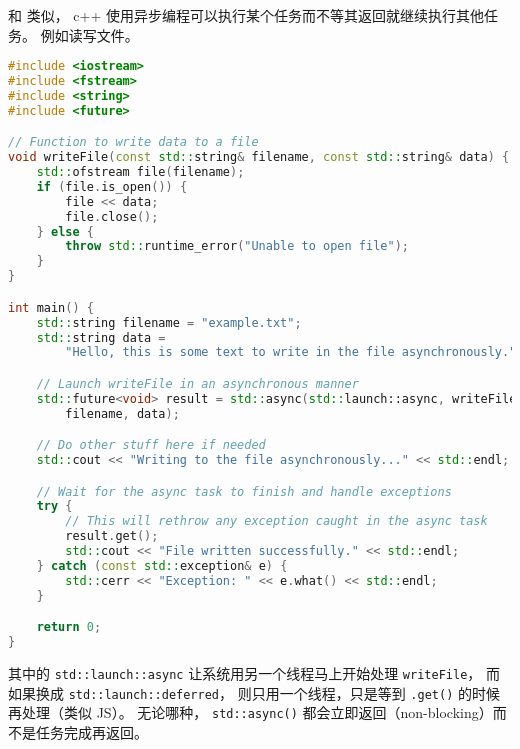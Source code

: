 
\begin{issues}
\issueDraft
\end{issues}

和 类似， c++ 使用异步编程可以执行某个任务而不等其返回就继续执行其他任务。 例如读写文件。

\begin{lstlisting}[language=cpp]
#include <iostream>
#include <fstream>
#include <string>
#include <future>

// Function to write data to a file
void writeFile(const std::string& filename, const std::string& data) {
    std::ofstream file(filename);
    if (file.is_open()) {
        file << data;
        file.close();
    } else {
        throw std::runtime_error("Unable to open file");
    }
}

int main() {
    std::string filename = "example.txt";
    std::string data =
        "Hello, this is some text to write in the file asynchronously.";

    // Launch writeFile in an asynchronous manner
    std::future<void> result = std::async(std::launch::async, writeFile,
        filename, data);

    // Do other stuff here if needed
    std::cout << "Writing to the file asynchronously..." << std::endl;

    // Wait for the async task to finish and handle exceptions
    try {
        // This will rethrow any exception caught in the async task
        result.get();
        std::cout << "File written successfully." << std::endl;
    } catch (const std::exception& e) {
        std::cerr << "Exception: " << e.what() << std::endl;
    }

    return 0;
}
\end{lstlisting}
其中的 \verb`std::launch::async` 让系统用另一个线程马上开始处理 \verb`writeFile`， 而如果换成 \verb`std::launch::deferred`， 则只用一个线程，只是等到 \verb`.get()` 的时候再处理（类似 JS）。 无论哪种， \verb`std::async()` 都会立即返回（non-blocking）而不是任务完成再返回。
